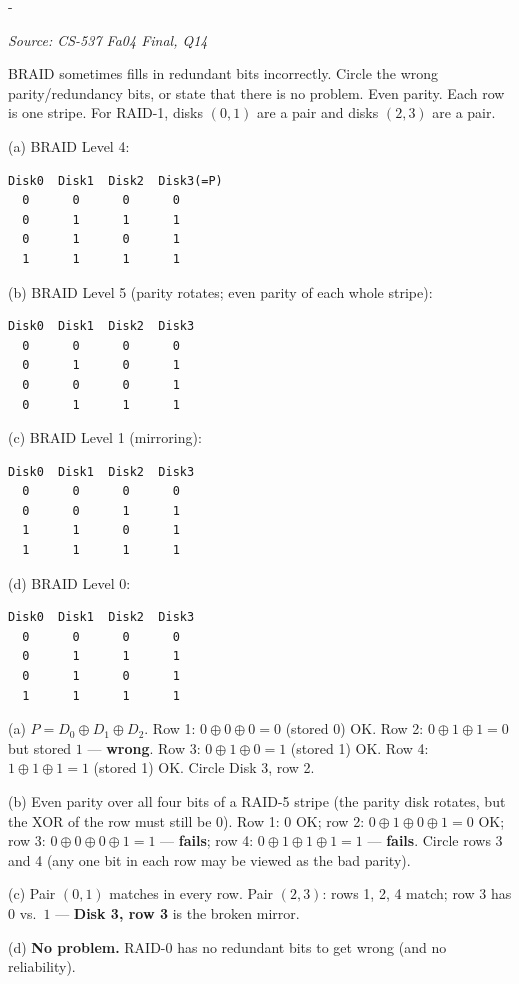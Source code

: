 \documentclass[11pt,a4paper]{article}
\makeatletter
\newcommand{\keepspace}[1]{\par\penalty-100\begingroup
  \setlength{\dimen@}{#1}\dimen@ii\pagegoal\advance\dimen@ii-\pagetotal
  \ifdim\dimen@>\dimen@ii\ifdim\dimen@ii>\z@\vfil\fi\break\fi\endgroup}
\newcounter{qn}[section]
\newenvironment{Qn}[4]{%
  \refstepcounter{qn}\keepspace{7\baselineskip}%
  \begin{tcolorbox}[qboxstyle, title={Q\thesection.\theqn\ \ [#1 \textbar\ #2]\ \ #4}]%
  {\footnotesize\color{g3}\textit{Source: #3}}\par\smallskip%
}{%
  \end{tcolorbox}%
}
\newenvironment{Sol}{%
  \begin{tcolorbox}[sboxstyle, title={Solution}]%
}{%
  \end{tcolorbox}\vspace{0.35em}%
}
\makeatother
\begin{document}
\begin{Qn}{Medium}{Lect 22A}{CS-537 Fa04 Final, Q14}{Broken RAID (BRAID): find the bad parity / mirror bits}
BRAID sometimes fills in redundant bits incorrectly. Circle the wrong
parity/redundancy bits, or state that there is no problem. Even parity.
Each row is one stripe. For RAID-1, disks $(0,1)$ are a pair and disks
$(2,3)$ are a pair.

(a) BRAID Level 4:
\begin{lstlisting}[numbers=none]
Disk0  Disk1  Disk2  Disk3(=P)
  0      0      0      0
  0      1      1      1
  0      1      0      1
  1      1      1      1
\end{lstlisting}

(b) BRAID Level 5 (parity rotates; even parity of each whole stripe):
\begin{lstlisting}[numbers=none]
Disk0  Disk1  Disk2  Disk3
  0      0      0      0
  0      1      0      1
  0      0      0      1
  0      1      1      1
\end{lstlisting}

(c) BRAID Level 1 (mirroring):
\begin{lstlisting}[numbers=none]
Disk0  Disk1  Disk2  Disk3
  0      0      0      0
  0      0      1      1
  1      1      0      1
  1      1      1      1
\end{lstlisting}

(d) BRAID Level 0:
\begin{lstlisting}[numbers=none]
Disk0  Disk1  Disk2  Disk3
  0      0      0      0
  0      1      1      1
  0      1      0      1
  1      1      1      1
\end{lstlisting}
\end{Qn}
\begin{Sol}
(a) $P = D_0 \oplus D_1 \oplus D_2$.
Row 1: $0\oplus 0\oplus 0 = 0$ (stored 0) OK.
Row 2: $0\oplus 1\oplus 1 = 0$ but stored $1$ --- \textbf{wrong}.
Row 3: $0\oplus 1\oplus 0 = 1$ (stored 1) OK.
Row 4: $1\oplus 1\oplus 1 = 1$ (stored 1) OK.
Circle Disk 3, row 2.

(b) Even parity over all four bits of a RAID-5 stripe (the parity disk
rotates, but the XOR of the row must still be 0).
Row 1: $0$ OK; row 2: $0\oplus 1\oplus 0\oplus 1 = 0$ OK;
row 3: $0\oplus 0\oplus 0\oplus 1 = 1$ --- \textbf{fails};
row 4: $0\oplus 1\oplus 1\oplus 1 = 1$ --- \textbf{fails}.
Circle rows 3 and 4 (any one bit in each row may be viewed as the bad
parity).

(c) Pair $(0,1)$ matches in every row. Pair $(2,3)$:
rows 1, 2, 4 match; row 3 has $0$ vs.\ $1$ --- \textbf{Disk 3, row 3}
is the broken mirror.

(d) \textbf{No problem.} RAID-0 has no redundant bits to get wrong
(and no reliability).
\end{Sol}
\end{document}
